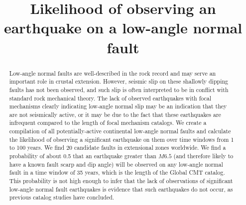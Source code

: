 \documentclass[twocolumn,grl]{AGUTeX}
\begin{document}
\title{Likelihood of observing an earthquake on a low-angle normal fault}



\begin{abstract}
Low-angle normal faults are well-described in the rock record and may serve an
important role in crustal extension.  However, seismic slip on these shallowly
dipping faults  has not been observed, and such slip is often interpreted to be
in conflict with standard rock mechanical theory.  The lack of observed
earthquakes with focal mechanisms clearly indicating low-angle normal slip may
be an indication that they are not seismically active, or it may be due to the
fact that these earthquakes are infrequent compared to the length of focal
mechanism catalogs.   We create a compilation of all potentially-active
continental low-angle normal faults and calculate the likelihood of observing
a significant earthquake on them over time windows from 1 to 100 years. We find
20 candidate faults in extensional zones worldwide.  We find a probability of
about 0.5 that an earthquake greater than $M6.5$ (and therefore likely to have
a known fault scarp and dip angle) will be observed on any low-angle normal
fault in a time window of 35 years, which is the length of the Global CMT
catalog.  This probability is not high enough to infer that the lack of
observations of significant low-angle normal fault earthquakes is evidence that
such earthquakes do not occur, as previous catalog studies have concluded.

\end{abstract}
\end{document}
